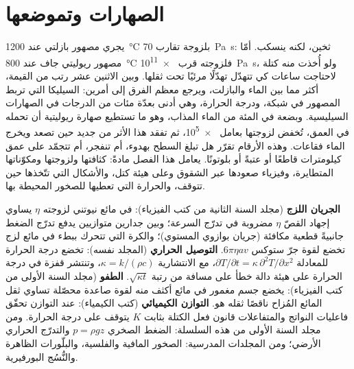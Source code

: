 \chapter{الصهارات وتموضعها}\label{ch:b2:magma-emplacement}

يجري مصهور بازلتي عند \qty{1200}{\celsius} بلزوجة تقارب
\qty{70}{Pa.s}: ثخين، لكنه ينسكب. أمّا مصهور ريوليتي جاف عند \qty{800}{\celsius}
فلزوجته قرب \qty{e11}{Pa.s}، ولو أُخذت منه كتلة لاحتاجت ساعات كي تتهدّل
تهدّلًا مرئيًا تحت ثقلها. وبين الاثنين عشر رتب من القيمة، أكثر
مما بين الماء والبازلت، ويرجع معظم الفرق إلى أمرين:
السيليكا التي تربط المصهور في شبكة، ودرجة الحرارة،
وهي أدنى بعدّة مئات من الدرجات في الصهارات السيليسية. وبضعة في المئة من
الماء المذاب، وهو ما تستطيع صهارة ريوليتية أن تحمله في العمق، تُخفض لزوجتها
بعامل \num{e5}، ثم تفقد هذا الأثر من جديد حين تصعد  ويخرج
الماء فقاعات. وهذه الأرقام تقرّر هل تبلغ 
السطح بهدوء، أم تنفجر، أم تتجمّد على عمق كيلومترات قاطعًا أو عتبةً أو
بلوتونًا. يعامل هذا الفصل  مادةً: كثافتها ولزوجتها
ومكوّناتها المتطايرة، وفيزياء صعودها عبر الشقوق وعلى هيئة كتل، والأشكال التي
تتّخذها حين تتوقف، والحرارة التي تعطيها للصخور المحيطة بها.

\begin{recall}
\textbf{الجريان اللزج} (مجلد السنة الثانية من كتب الفيزياء): في مائع نيوتني
لزوجته $\eta$ يساوي إجهاد القصّ $\eta$ مضروبة في تدرّج السرعة؛ وبين
جدارين متوازيين يدفع تدرّج الضغط جانبيةً قطعية مكافئة (جريان بوازوي
المستوي)؛ والكرة التي تتحرك ببطء في مائع لزج تخضع لقوة جرّ ستوكس
$6\pi\eta a v$. \textbf{التوصيل الحراري} (المجلد نفسه): تخضع درجة الحرارة للمعادلة
$\partial T/\partial t = \kappa\,\partial^2T/\partial x^2$، مع الانتشارية $\kappa = k/(\rho
c)$، وتنتشر قفزة في درجة الحرارة على هيئة دالة خطأ على مسافة من
رتبة $\sqrt{\kappa t}$. \textbf{الطفو} (مجلد السنة الأولى من كتب الفيزياء): يخضع جسم
مغمور في مائع أكثف منه لقوة صاعدة محصّلة تساوي ثقل المائع
المُزاح ناقصًا ثقله هو. \textbf{التوازن الكيميائي} (كتب الكيمياء): عند
التوازن تحقّق فاعليات النواتج والمتفاعلات قانون فعل
الكتلة بثابت $K$ يتوقف على درجة الحرارة. ومن مجلد السنة الأولى
من هذه السلسلة: الضغط الصخري $p = \rho g z$ والتدرّج الحراري الأرضي؛ ومن
المجلدات المدرسية: الصخور المافية والفلسية، والبلّورات الظاهرة والنُّسُج البورفيرية.
\end{recall}

